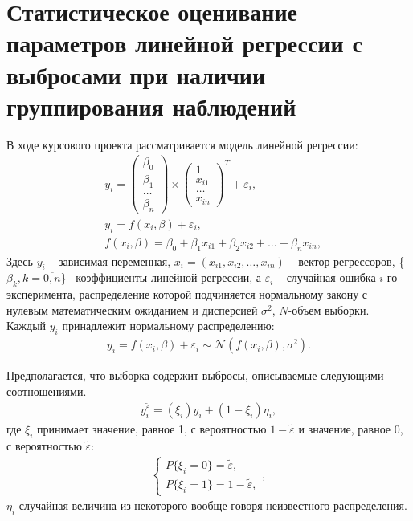 \section{Статистическое оценивание параметров линейной регрессии с выбросами при наличии группирования наблюдений}
В ходе курсового проекта рассматривается модель линейной регрессии:
\begin{eqnarray}
    &\label{eq2}y_i= 
    \begin{pmatrix}
        \beta_0\\
        \beta_1\\
        \dots\\
        \beta_n
    \end{pmatrix}\times
    \begin{pmatrix}
        1\\
        x_{i1}\\
        \dots\\
        x_{in}
    \end{pmatrix}^{T}+ \varepsilon_i,\\
    &y_i= f(x_i,\beta)+\varepsilon_i,\\
    &f(x_i,\beta)=\beta_0+\beta_1 x_{i1}+\beta_2 x_{i2}+\dots+\beta_n x_{in},
\end{eqnarray}
Здесь $y_i$ -- зависимая переменная, $x_i=(x_{i1},x_{i2},\dots,x_{in})$ -- вектор регрессоров, \{$\beta_k, k=\overline{0,n}$\}-- коэффициенты линейной регрессии, а $\varepsilon_i$ -- случайная ошибка $i$-го эксперимента, распределение которой подчиняется нормальному закону с нулевым математическим ожиданием и дисперсией $\sigma^2$, $N$-объем выборки.
Каждый $y_i$ принадлежит нормальному распределению:
\begin{eqnarray}
    \label{eq12} y_i=f(x_i,\beta)+\varepsilon_i \sim \mathcal{N}(f(x_i,\beta),\sigma^2).
\end{eqnarray}

Предполагается, что выборка содержит выбросы, описываемые следующими соотношениями.
\begin{eqnarray}
    \label{eq3}y_i^{\widetilde{\varepsilon}}=(\xi_i)y_i+ (1-\xi_i)\eta_i,
\end{eqnarray}
где $\xi_i$ принимает значение, равное 1, с вероятностью $1-\widetilde{\varepsilon}$ и значение, равное 0, с вероятностью $\widetilde{\varepsilon}$:
\begin{eqnarray}\label{eq4}
    \begin{cases}
        P\{\xi_i=0\}=\widetilde{\varepsilon},\\
        P\{\xi_i=1\}=1-\widetilde{\varepsilon},
    \end{cases},
\end{eqnarray}
$\eta_i$-случайная величина из некоторого вообще говоря неизвестного распределения.


